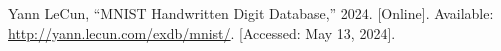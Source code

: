 \documentclass[conference]{IEEEtran}
\begin{document}
\begin{thebibliography}{00}

 Yann LeCun, ``MNIST Handwritten Digit Database,'' 2024. [Online]. Available: \url{http://yann.lecun.com/exdb/mnist/}. [Accessed: May 13, 2024].


\end{thebibliography}
\end{document}
